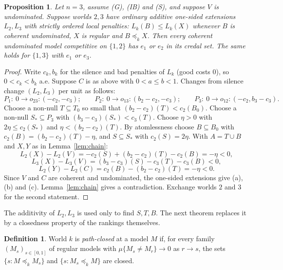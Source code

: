 \documentclass[11pt]{article}
\newtheorem{proposition}[theorem]{Proposition}
\theoremstyle{definition}\newtheorem{definition}[theorem]{Definition}
\theoremstyle{remark}\newtheorem{remark}[theorem]{Remark}
\begin{document}
\begin{proposition}\label{prop:endpoint}
Let $n=3$, assume (G), (IB) and (S), and suppose $V$ is undominated. Suppose
worlds $2,3$ have ordinary additive one-sided extensions $L_2,L_3$ with
strictly ordered local penalties: $L_k(B)\le L_k(X)$ whenever $B$ is coherent
undominated, $X$ is regular and $B\preceq_kX$. Then every coherent undominated
model competitive on $\{1,2\}$ has $e_1$ or $e_2$ in its credal set. The same
holds for $\{1,3\}$ with $e_1$ or $e_3$.
\end{proposition}
\begin{proof}
Write $c_k,b_k$ for the silence and bad penalties of $L_k$ (good costs $0$),
so $0<c_k<b_k$ a.e. Suppose $C$ is as above with $0<a\le b<1$. Changes from
silence change $(L_2,L_3)$ per unit as follows:
\[
 P_1:\ 0\to o_{23}\colon(-c_2,-c_3);\qquad
 P_2:\ 0\to o_{13}\colon(b_2-c_2,-c_3);\qquad
 P_3:\ 0\to o_{12}\colon(-c_2,b_3-c_3).
\]
Choose a non-null $T\subseteq T_0$ so small that
$(b_2-c_2)(T)<c_2(B_0)$. Choose a non-null $S_*\subseteq P_3$ with
$(b_3-c_3)(S_*)<c_3(T)$. Choose $\eta>0$ with $2\eta\le c_2(S_*)$ and
$\eta<(b_2-c_2)(T)$. By atomlessness choose $B\subseteq B_0$ with
$c_2(B)=(b_2-c_2)(T)-\eta$, and $S\subseteq S_*$ with $c_2(S)=2\eta$. With
$A=T\cup B$ and $X,Y$ as in Lemma~\ref{lem:chain}:
\[
 L_2(X)-L_2(V)=-c_2(S)+(b_2-c_2)(T)-c_2(B)=-\eta<0,
\]
\[
 L_3(X)-L_3(V)=(b_3-c_3)(S)-c_3(T)-c_3(B)<0,
\]
\[
 L_2(Y)-L_2(C)=c_2(B)-(b_2-c_2)(T)=-\eta<0.
\]
Since $V$ and $C$ are coherent and undominated, the one-sided extensions give
(a), (b) and (c). Lemma~\ref{lem:chain} gives a contradiction. Exchange worlds
$2$ and $3$ for the second statement.
\end{proof}

The additivity of $L_2,L_3$ is used only to find $S,T,B$. The next theorem
replaces it by a closedness property of the rankings themselves.

\begin{definition}
World $k$ is \emph{path-closed} at a model $M$ if, for every family
$(M_s)_{s\in[0,1]}$ of regular models with $\mu\{M_s\ne M_r\}\to0$ as $r\to s$,
the sets $\{s:M\preceq_kM_s\}$ and $\{s:M_s\preceq_kM\}$ are closed.
\end{definition}
\end{document}
